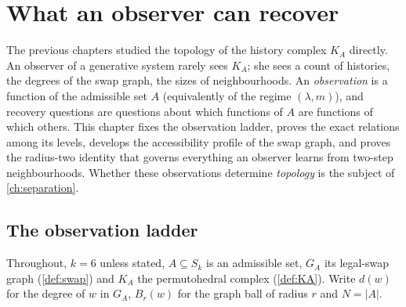 \chapter{What an observer can recover}\label{ch:access}

The previous chapters studied the topology of the history complex $K_A$ directly. An observer of a generative system rarely sees $K_A$; she sees a count of histories, the degrees of the swap graph, the sizes of neighbourhoods. An \emph{observation} is a function of the admissible set $A$ (equivalently of the regime $(\lambda,m)$), and recovery questions are questions about which functions of $A$ are functions of which others. This chapter fixes the observation ladder, proves the exact relations among its levels, develops the accessibility profile of the swap graph, and proves the radius-two identity that governs everything an observer learns from two-step neighbourhoods. Whether these observations determine \emph{topology} is the subject of \cref{ch:separation}.

\section{The observation ladder}\label{sec:ladder}
Throughout, $k=6$ unless stated, $A\subseteq S_k$ is an admissible set, $G_A$ its legal-swap graph (\cref{def:swap}) and $K_A$ the permutohedral complex (\cref{def:KA}). Write $d(w)$ for the degree of $w$ in $G_A$, $B_r(w)$ for the graph ball of radius $r$ and $N=|A|$.

